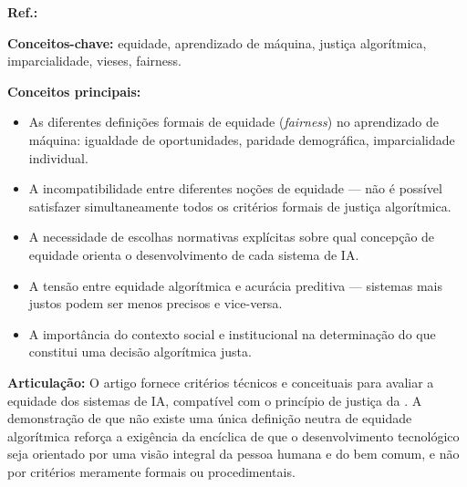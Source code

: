 \begin{fichamento}
    \textbf{Ref.:} \cite{Binns2018ITG}
    
    \textbf{Conceitos-chave:} equidade, aprendizado de máquina, justiça algorítmica, imparcialidade, vieses, fairness.
    
    \textbf{Conceitos principais:}
    \begin{itemize}
        \item As diferentes definições formais de equidade (\textit{fairness}) no aprendizado de máquina: igualdade de oportunidades, paridade demográfica, imparcialidade individual.
        \item A incompatibilidade entre diferentes noções de equidade — não é possível satisfazer simultaneamente todos os critérios formais de justiça algorítmica.
        \item A necessidade de escolhas normativas explícitas sobre qual concepção de equidade orienta o desenvolvimento de cada sistema de IA.
        \item A tensão entre equidade algorítmica e acurácia preditiva — sistemas mais justos podem ser menos precisos e vice-versa.
        \item A importância do contexto social e institucional na determinação do que constitui uma decisão algorítmica justa.
    \end{itemize}
    
    \textbf{Articulação:} O artigo fornece critérios técnicos e conceituais para avaliar a equidade dos sistemas de IA, compatível com o princípio de justiça da \MH{}. A demonstração de que não existe uma única definição neutra de equidade algorítmica reforça a exigência da encíclica de que o desenvolvimento tecnológico seja orientado por uma visão integral da pessoa humana e do bem comum, e não por critérios meramente formais ou procedimentais.
\end{fichamento}

